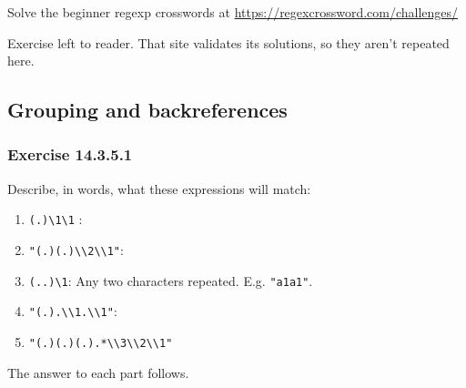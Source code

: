 \documentclass[]{book}
\providecommand{\tightlist}{%
  \setlength{\itemsep}{0pt}\setlength{\parskip}{0pt}}
\theoremstyle{plain}
\theoremstyle{remark}
\theoremstyle{definition}
\theoremstyle{definition}
\theoremstyle{definition}
\theoremstyle{remark}
\begin{document}
Solve the beginner regexp crosswords at
\url{https://regexcrossword.com/challenges/}

Exercise left to reader. That site validates its solutions, so they
aren't repeated here.

\hypertarget{grouping-and-backreferences}{%
\subsection{Grouping and
backreferences}\label{grouping-and-backreferences}}

\hypertarget{exercise-14.3.5.1}{%
\subsubsection*{\texorpdfstring{Exercise
{14.3.5.1}}{Exercise 14.3.5.1}}\label{exercise-14.3.5.1}}

Describe, in words, what these expressions will match:

\begin{enumerate}
\def\labelenumi{\arabic{enumi}.}
\tightlist
\item
  \texttt{(.)\textbackslash{}1\textbackslash{}1} :
\item
  \texttt{"(.)(.)\textbackslash{}\textbackslash{}2\textbackslash{}\textbackslash{}1"}:
\item
  \texttt{(..)\textbackslash{}1}: Any two characters repeated. E.g.
  \texttt{"a1a1"}.
\item
  \texttt{"(.).\textbackslash{}\textbackslash{}1.\textbackslash{}\textbackslash{}1"}:
\item
  \texttt{"(.)(.)(.).*\textbackslash{}\textbackslash{}3\textbackslash{}\textbackslash{}2\textbackslash{}\textbackslash{}1"}
\end{enumerate}

The answer to each part follows.
\end{document}
